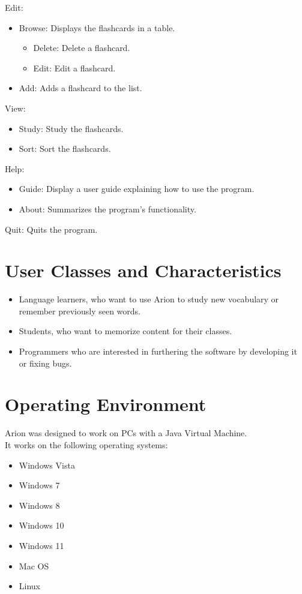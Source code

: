\documentclass{scrreprt}
\begin{document}
Edit:
\begin{itemize}
    \item Browse: Displays the flashcards in a table.
    \begin{itemize}
        \item Delete: Delete a flashcard.
        \item Edit: Edit a flashcard.
    \end{itemize}
    \item Add: Adds a flashcard to the list.
\end{itemize}

View:
\begin{itemize}
    \item Study: Study the flashcards.
    \item Sort: Sort the flashcards.
\end{itemize}

Help:
\begin{itemize}
    \item Guide: Display a user guide explaining how to use the program.
    \item About: Summarizes the program's functionality.
\end{itemize}

Quit: Quits the program.

\section{User Classes and Characteristics}
\begin{itemize}
    \item Language learners, who want to use Arion to study new vocabulary or remember previously seen words.
    \item Students, who want to memorize content for their classes.
    \item Programmers who are interested in furthering the software by developing it or fixing bugs.
\end{itemize}

\section{Operating Environment}

\begin{flushleft} %
    Arion was designed to work on PCs with a Java Virtual Machine. \\

    It works on the following operating systems: \\
    \begin{itemize}
        \item Windows Vista
        \item Windows 7
        \item Windows 8
        \item Windows 10
        \item Windows 11
        \item Mac OS
        \item Linux
    \end{itemize}
\end{flushleft}
\end{document}
